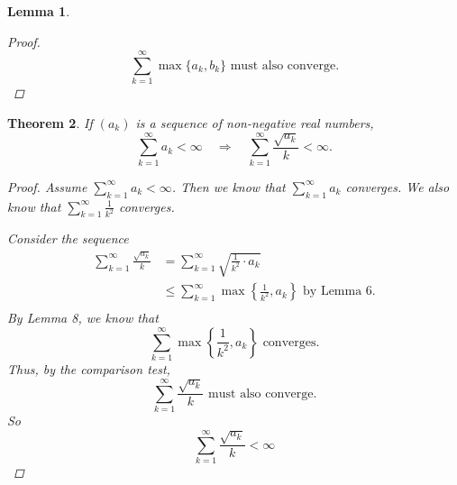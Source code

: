 \documentclass{amsart}
\newtheorem{theorem}{Theorem}
\newtheorem{lemma}[theorem]{Lemma}
\begin{document}
\begin{enumerate}[1.]
\begin{lemma}
\begin{proof}
        \[
            \displaystyle \sum_{k=1}^\infty \max\{a_k, b_k\} \text{ must also converge.}
        \]
    \end{proof}
\end{lemma}
\begin{theorem} 
    If $(a_k)$ is a sequence of non-negative real numbers,
    \[ \sum_{k=1}^{\infty} a_k < \infty \quad \Rightarrow \quad \sum_{k=1}^{\infty} \frac{\sqrt{a_k}}{k} < \infty. \]
    \begin{proof}
        Assume $\sum_{k=1}^{\infty} a_k < \infty$. Then we know that $\sum_{k=1}^{\infty} a_k $ converges.
        We also know that $\sum_{k=1}^{\infty} \frac{1}{k^2}$ converges.

        Consider the sequence 
        \begin{align*}
            \sum_{k=1}^{\infty} \frac{\sqrt{a_k}}{k} &= \sum_{k=1}^{\infty} \sqrt{\frac{1}{k^2} \cdot a_k } \\
            &\leq \sum_{k=1}^{\infty} \max \left\{ \frac{1}{k^2}, a_k \right\} \text{ by Lemma 6.} \\
        \end{align*}
        By Lemma 8, we know that 
        \[
            \sum_{k=1}^{\infty} \max \left\{ \frac{1}{k^2}, a_k \right\} \text{ converges.}
        \]
        Thus, by the comparison test,
        \[
            \sum_{k=1}^{\infty} \frac{\sqrt{a_k}}{k} \text{ must also converge.}
        \]
        So 
        \[
            \sum_{k=1}^{\infty} \frac{\sqrt{a_k}}{k} < \infty
        \]
    \end{proof}
\end{theorem}




\end{enumerate}
\end{document}
